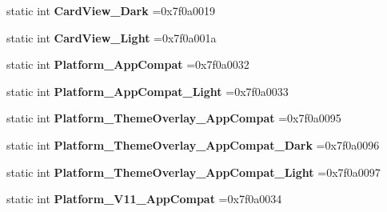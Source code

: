 \begin{DoxyCompactItemize}
static int {\bfseries Card\+View\+\_\+\+Dark} =0x7f0a0019
\item 
\mbox{\label{classandroid_1_1support_1_1v7_1_1recyclerview_1_1R_1_1style_a5d206905bb1d7acc3cf338d7edf94b73}} 
static int {\bfseries Card\+View\+\_\+\+Light} =0x7f0a001a
\item 
\mbox{\label{classandroid_1_1support_1_1v7_1_1recyclerview_1_1R_1_1style_a7e5a292d9306dfa9ba8f48f1f071ce1c}} 
static int {\bfseries Platform\+\_\+\+App\+Compat} =0x7f0a0032
\item 
\mbox{\label{classandroid_1_1support_1_1v7_1_1recyclerview_1_1R_1_1style_a733f8850db5d96462b32a7f6843699ba}} 
static int {\bfseries Platform\+\_\+\+App\+Compat\+\_\+\+Light} =0x7f0a0033
\item 
\mbox{\label{classandroid_1_1support_1_1v7_1_1recyclerview_1_1R_1_1style_a185761ee7666969d0055b97bcf31307b}} 
static int {\bfseries Platform\+\_\+\+Theme\+Overlay\+\_\+\+App\+Compat} =0x7f0a0095
\item 
\mbox{\label{classandroid_1_1support_1_1v7_1_1recyclerview_1_1R_1_1style_ac5823cc491a527cbc5e666932cfc97d1}} 
static int {\bfseries Platform\+\_\+\+Theme\+Overlay\+\_\+\+App\+Compat\+\_\+\+Dark} =0x7f0a0096
\item 
\mbox{\label{classandroid_1_1support_1_1v7_1_1recyclerview_1_1R_1_1style_a543c66fcd6a2369e7f098016139c0fd6}} 
static int {\bfseries Platform\+\_\+\+Theme\+Overlay\+\_\+\+App\+Compat\+\_\+\+Light} =0x7f0a0097
\item 
\mbox{\label{classandroid_1_1support_1_1v7_1_1recyclerview_1_1R_1_1style_a8c322410f82b32470373f7881e7022e9}} 
static int {\bfseries Platform\+\_\+\+V11\+\_\+\+App\+Compat} =0x7f0a0034
\item 
\mbox{\label{classandroid_1_1support_1_1v7_1_1recyclerview_1_1R_1_1style_a5b630f3d4a2a1afacf517cf57fec118d}} 

\end{DoxyCompactItemize}
